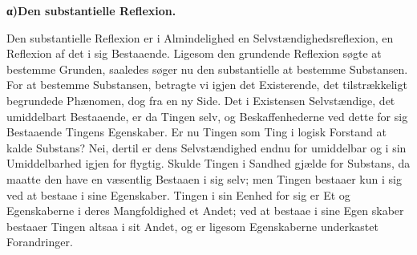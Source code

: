 \documentclass[12pt]{book}
\newcommand{\opage}[1]{\marginnote{\footnotesize\textit{[#1]}}}
\begin{document}
\begin{center}{\bfseries α)\quad Den substantielle Reflexion.}\end{center}

Den substantielle Reflexion er i Almindelighed en Selvstændighedsreflexion, en
Reflexion af det i sig Bestaaende. Ligesom den grundende Reflexion søgte at bestemme
Grunden, saaledes søger nu den substantielle at bestemme Substansen. For at bestemme
Substansen, betragte vi igjen det Existerende, det tilstrækkeligt begrundede
Phænomen, dog fra en ny Side. Det i Existensen Selvstændige, det umiddelbart
Bestaaende, er da Tingen selv, og Beskaffenhederne ved dette for sig Bestaaende
Tingens Egenskaber. Er nu Tingen som Ting i logisk Forstand at kalde Substans? Nei,
dertil er dens Selvstændighed endnu for umiddelbar og i sin Umiddelbarhed igjen for
flygtig. Skulde Tingen i Sandhed gjælde for Substans, da maatte den have en væsentlig
Bestaaen i sig selv; men Tingen bestaaer kun i sig ved at bestaae i sine Egenskaber.
Tingen i sin Eenhed for sig er Et og Egenskaberne i deres Mangfoldighed et Andet; ved
at bestaae i sine Egen%
\opage{107} skaber bestaaer Tingen altsaa i sit Andet, og er ligesom Egenskaberne underkastet
Forandringer.
\end{document}
